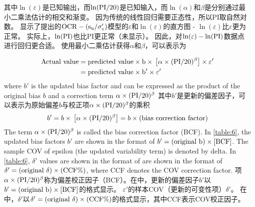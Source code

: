 \begin{Parallel}{0.60\textwidth}{}
{    }
    \ParallelRText
    {
        其中$\ln(\varepsilon)$是已知输出，而$\ln(\rm{PI}/20)$是已知输入，而$\ln(\alpha)$和$\beta$是分别通过最小二乘法估计的相交和渐变。 因为传统的线性回归需要正态性，所以PI取自然对数。 显示了\citet{Jamiolkowski198557}提出的$\rm{OCR}-(s_u/\sigma_v')$模型的$\varepsilon$和$\ln(\varepsilon)$的直方图 - $\ln(\varepsilon)$比$\varepsilon$更为正常。 实际上，$\ln(\rm{PI})$也比PI更正常（未显示）。 因此，对$\ln(\varepsilon)-\ln(\rm{PI})$数据点进行回归更合适。 使用最小二乘估计获得$\alpha$和$\beta$，可以表示为
    }
    \ParallelPar
    
    \begin{align}
        \begin{split}
            \rm{Actual~value}&=\rm{predicted~value}\times{}b\times{}\left[\alpha\times{}(\rm{PI}/20)^\beta\right]\times{}\varepsilon'\\
            &=\rm{predicted~value}\times{}b'\times{}\varepsilon'
        \end{split}
        \label{equation:6}
    \end{align}
    \ParallelLText
    {
        where $b'$ is the updated bias factor and can be expressed as the product of the original bias $b$ and a correction term $\alpha\times{}(\rm{PI}/20)^\beta$
    }
    \ParallelRText
    {
        其中$b'$是更新的偏差因子，可以表示为原始偏差$b$与校正项$\alpha\times{}(\rm{PI}/20)^\beta$的乘积
    }
    \ParallelPar
    \begin{align}
        b'=b\times{}\left[\alpha\times{}(\rm{PI}/20)^\beta\right]=b\times{}(\rm{bias~correction~factor})
        \label{equation:7}
    \end{align}
    \ParallelLText
    {
        The term  $\alpha\times{}(\rm{PI}/20)^\beta$ is called the bias correction factor (BCF). In \autoref{table:6}, the updated bias factors $b'$ are shown in the format of $b'=(\rm{original}~b)\times{}[BCF]$. The sample COV of epsilou (the updated variability term) is denoted by delta. In \autoref{table:6}, $\delta'$ values are shown in the format of are shown in the format of $\delta'=(\rm{original}~\delta)\times{}(\rm{CCF}\%)$, where CCF denotes the COV correction factor.
    }
    \ParallelRText
    {
        项$\alpha\times{}(\rm{PI}/20)^\beta$称为偏差校正因子（BCF）。在中，更新的偏差因子$b'$以$b'=(\rm{original}~b)\times{}[BCF]$的格式显示。 $\varepsilon'$的样本COV（更新的可变性项）$\delta'$。 在中，$\delta'$以$\delta'=(\rm{original}~\delta)\times{}(\rm{CCF}\%)$的格式显示，其中CCF表示COV校正因子。
}
\end{Parallel}
